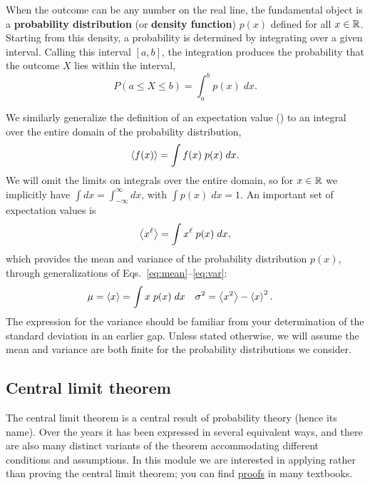 When the outcome can be any number on the real line, the fundamental object is a \textbf{probability distribution} (or \textbf{density function}) $p(x)$ defined for all $x \in \mathbb R$.
Starting from this density, a probability is determined by integrating over a given interval.
Calling this interval $[a, b]$, the integration produces the probability that the outcome $X$ lies within the interval,
\begin{equation*}
  P\left(a \leq X \leq b\right) = \int_a^b p(x) \; dx.
\end{equation*}

We similarly generalize the definition of an expectation value () to an integral over the entire domain of the  probability distribution,
\begin{equation*}
  \left\langle f(x) \right\rangle = \int f(x) \; p(x) \; dx.
\end{equation*}
We will omit the limits on integrals over the entire domain, so for $x \in \mathbb R$ we implicitly have $\int dx = \int_{-\infty}^{\infty} dx$, with $\int p(x) \; dx = 1$.
An important set of expectation values is
\begin{equation}
  \label{eq:expect_cont}
  \left\langle x^{\ell} \right\rangle = \int x^{\ell} \; p(x) \; dx,
\end{equation}
which provides the mean and variance of the probability distribution $p(x)$, through generalizations of Eqs.~\ref{eq:mean}--\ref{eq:var}:
\begin{align}
  \label{eq:mean_var}
  \mu   & = \left\langle x \right\rangle = \int x \; p(x) \; dx &
  \sigma^2 & = \left\langle x^2 \right\rangle - \left\langle x \right\rangle^2.
\end{align}
The expression for the variance should be familiar from your determination of the standard deviation in an earlier gap.
Unless stated otherwise, we will assume the mean and variance are both finite for the probability distributions we consider.



\subsection{\label{sec:CLT}Central limit theorem}
The central limit theorem is a central result of probability theory (hence its name).
Over the years it has been expressed in several equivalent ways, and there are also many distinct variants of the theorem accommodating different conditions and assumptions.
In this module we are interested in applying rather than proving the central limit theorem; you can find \href{https://en.wikipedia.org/wiki/Central_limit_theorem#Proof_of_classical_CLT}{proofs} in many textbooks.

